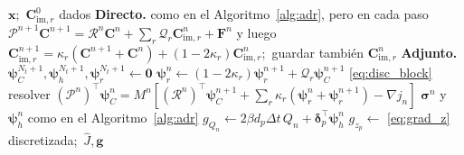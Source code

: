 \documentclass[11pt]{article}
\numberwithin{equation}{section}
\theoremstyle{plain}
\theoremstyle{definition}
\theoremstyle{remark}
\newcommand{\im}{\mathrm{im}}
\begin{document}
\begin{algorithm}[h]
\caption{\textsc{EvalJG} para MRMT por bloque}
\label{alg:block}
\begin{algorithmic}[1]
\Require $\mathbf{x}$;\ $\mathbf{C}_{\im,r}^0$ dados
\State \textbf{Directo.} como en el Algoritmo~\ref{alg:adr}, pero en cada paso
  $\mathcal{P}^{n+1}\mathbf{C}^{n+1}=\mathcal{R}^n\mathbf{C}^n+\sum_r\mathcal{Q}_r\mathbf{C}_{\im,r}^n+\mathbf{F}^n$
  y luego $\mathbf{C}_{\im,r}^{n+1}=\kappa_r(\mathbf{C}^{n+1}+\mathbf{C}^n)+(1-2\kappa_r)\mathbf{C}_{\im,r}^n$;\ guardar también $\mathbf{C}_{\im,r}^n$
\State \textbf{Adjunto.} $\boldsymbol\psi_C^{N_t+1},\boldsymbol\psi_h^{N_t+1},\boldsymbol\psi_r^{N_t+1}\gets\mathbf{0}$
    \State $\boldsymbol\psi_r^{n}\gets(1-2\kappa_r)\boldsymbol\psi_r^{n+1}+\mathcal{Q}_r\boldsymbol\psi_C^{n+1}$ \hfill \eqref{eq:disc_block}
  \EndFor
  \State resolver $(\mathcal{P}^{n})^\top\boldsymbol\psi_C^{n}=M^n[(\mathcal{R}^{n})^\top\boldsymbol\psi_C^{n+1}+\sum_r\kappa_r(\boldsymbol\psi_r^{n}+\boldsymbol\psi_r^{n+1})-\nabla j_n]$
  \State $\boldsymbol\sigma^n$ y $\boldsymbol\psi_h^{n}$ como en el Algoritmo~\ref{alg:adr}
  \State $g_{Q_n}\gets2\beta d_p\Delta t\,Q_n+\boldsymbol\delta_p^\top\boldsymbol\psi_h^{n}$
\EndFor
\State $g_{z_p}\gets$ \eqref{eq:grad_z} discretizada;\ \Return $\hat J,\mathbf{g}$
\end{algorithmic}
\end{algorithm}
\end{document}
